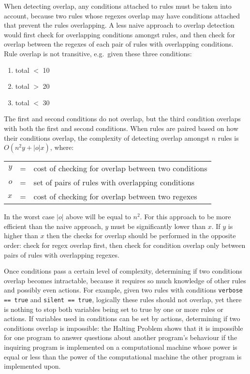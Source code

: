 When detecting overlap, any conditions attached to rules must be taken into
account, because two rules whose regexes overlap may have conditions
attached that prevent the rules overlapping.  A less naive approach to
overlap detection would first check for overlapping conditions amongst
rules, and then check for overlap between the regexes of each pair of rules
with overlapping conditions.  Rule overlap is not transitive, e.g.\ given
these three conditions:

\begin{enumerate}

    \squeezeitems{}

    \item total $<$ 10

    \item total $>$ 20

    \item total $<$ 30

\end{enumerate}

\noindent{}The first and second conditions do not overlap, but the third
condition overlaps with both the first and second conditions.  When rules
are paired based on how their conditions overlap, the complexity of
detecting overlap amongst $n$ rules is $O\left(n^{2}y+|o|x\right)$, where:

\begin{tabular}[]{rcl}

    $y$ & = & cost of checking for overlap between two conditions \\
    $o$ & = & set of pairs of rules with overlapping conditions   \\
    $x$ & = & cost of checking for overlap between two regexes    \\

\end{tabular}

In the worst case $|o|$ above will be equal to $n^{2}$.  For this approach
to be more efficient than the naive approach, $y$ must be significantly
lower than $x$.  If $y$ is higher than $x$ then the checks for overlap
should be performed in the opposite order: check for regex overlap first,
then check for condition overlap only between pairs of rules with
overlapping regexes.

Once conditions pass a certain level of complexity, determining if two
conditions overlap becomes intractable, because it requires so much
knowledge of other rules and possibly even actions.  For example, given two
rules with conditions \verb!verbose == true! and \verb!silent == true!,
logically these rules should not overlap, yet there is nothing to stop both
variables being set to true by one or more rules or actions.  If variables
used in conditions can be set by actions, determining if two conditions
overlap is impossible: the Halting Problem shows that it is impossible for
one program to answer questions about another program's behaviour if the
inquiring program is implemented on a computational machine whose power is
equal or less than the power of the computational machine the other program
is implemented upon.

